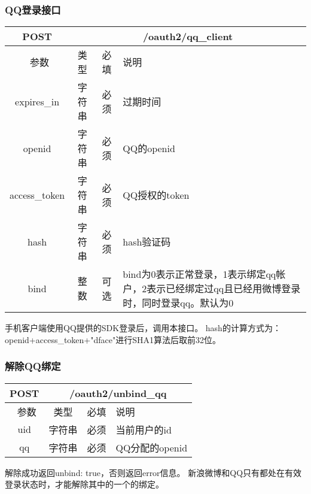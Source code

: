\subsubsection{QQ登录接口}
\label{hash_algorithm}

\begin{table}[H]
   \begin{center}
\begin{tabular}{|c|c|c|p{12cm}|}
\hline
POST & \multicolumn{3}{|c|}{/oauth2/qq\_client} \\
\hline\hline
 \  参数  & 类型 & 必填 &  说明  \\
 \hline
 expires\_in  & 字符串 & 必须 &  过期时间\\
  \hline
 openid  & 字符串 & 必须 &  QQ的openid\\
  \hline
 access\_token  & 字符串 & 必须 &  QQ授权的token\\
 \hline
 hash  & 字符串 & 必须 &  hash验证码\\
 \hline
 bind  & 整数 & 可选 &  bind为0表示正常登录，1表示绑定qq帐户，2表示已经绑定过qq且已经用微博登录时，同时登录qq。默认为0\\

\hline
\end{tabular}
   \end{center}
\end{table}
手机客户端使用QQ提供的SDK登录后，调用本接口。
hash的计算方式为：openid+access\_token+"dface"进行SHA1算法后取前32位。

\subsubsection{解除QQ绑定}

\begin{table}[H]
   \begin{center}
\begin{tabular}{|c|c|c|p{12cm}|}
\hline
POST & \multicolumn{3}{|c|}{/oauth2/unbind\_qq} \\
\hline\hline
 \  参数  & 类型 & 必填 &  说明  \\
\hline
    uid  & 字符串 & 必须 &  当前用户的id\\
\hline
    qq  & 字符串 & 必须 &  QQ分配的openid\\    
\hline
\end{tabular}
   \end{center}
\end{table}
解除成功返回{unbind: true}，否则返回error信息。
新浪微博和QQ只有都处在有效登录状态时，才能解除其中的一个的绑定。



